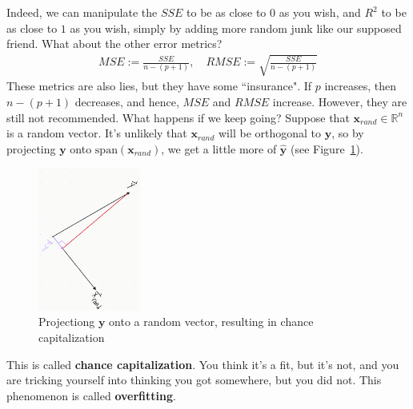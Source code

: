 \documentclass[12pt, a4paper]{article}
\theoremstyle{definition}
\begin{document}
	Indeed, we can manipulate the $SSE$ to be as close to $0$ as you wish, and $R^2$
	to be as close to $1$ as you wish, simply by adding more random junk like our
	supposed friend. What about the other error metrics?
	\begin{align*}
		MSE := \frac{SSE}{n - (p + 1)},\quad RMSE := \sqrt{\frac{SSE}{n-(p+1)}}
	\end{align*}
	These metrics are also lies, but they have some ``insurance". If $p$ increases,
	then $n-(p+1)$ decreases, and hence, $MSE$ and $RMSE$ increase. However, they
	are still not recommended. What happens if we keep going? Suppose that
	$\mathbf{x}_{rand}\in \mathbb{R}^n$ is a random vector. It's unlikely that
	$\mathbf{x}_{rand}$ will be orthogonal to $\mathbf{y}$, so by projecting
	$\mathbf{y}$ onto $\text{span}(\mathbf{x}_{rand})$, we get a little more
	of $\mathbf{\hat{y}}$ (see Figure~\ref{fig:chance-capitalization}).
	\begin{figure}
		\centering
		\includegraphics[width=0.3\textwidth]{projecting-onto-xrand}
		\caption{Projectiong $\mathbf{y}$ onto a random vector, resulting
		in chance capitalization}
		\label{fig:chance-capitalization}
	\end{figure}
	This is called \textbf{chance capitalization}. You think it's a fit, but it's not, and you
	are tricking yourself into thinking you got somewhere, but you did not.
	This phenomenon is called \textbf{overfitting}.
	
\end{document}
